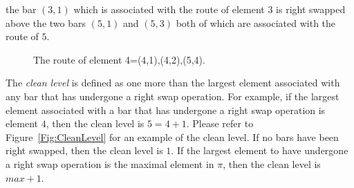 the bar $(3,1)$ which is associated with the route of element $3$ is right swapped above the two bars $(5,1)$ and $(5,3)$ 
both of which are associated with the route of $5$.\par 
\begin{figure}[h]
	\centering
	\caption{The route of element 4=(4,1),(4,2),(5,4).}
	\label{Fig:Route}
\end{figure}



The \emph{clean level} is defined as one more than the largest 
element associated with any bar that has undergone a right swap operation. 
For example, if the largest element associated with a bar that has undergone a 
right swap operation is element $4$, then the clean level is $5=4+1$.
 Please refer to Figure~\ref{Fig:CleanLevel} for an example of the clean level.
 If no bars have been right swapped, then the clean level is $1$.
If the largest element to have undergone a right swap operation is the maximal element in $\pi$, 
then the clean level is $max+1$.\pagebreak


